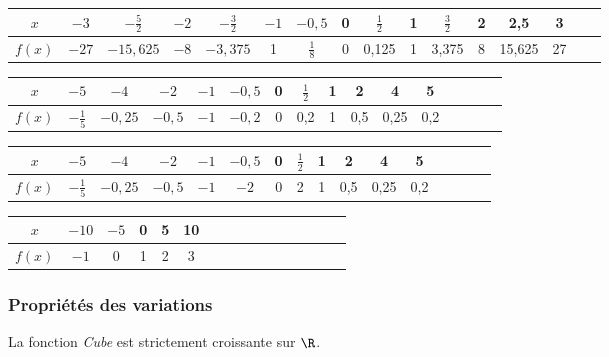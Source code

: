 \begin{tabular}{|c|c|c|c|c|c|c|c|c|c|c|c|c|c|c|c|}
\hline 
$x$ & $-3$ & $-\frac{5}{2}$ & $-2$ & $-\frac{3}{2}$ & $-1$ & $-0,5$ &  0 & $\frac{1}{2}$ & 1 & $\frac{3}{2}$ & 2 & 2,5 & 3 \\ 
\hline 
$f(x)$ & $-27$ & $-15,625$ & $-8$ & $-3,375$ & 1 & $\frac{1}{8}$ & 0 & 0,125 & 1 & 3,375 & 8 & 15,625  & 27 \\ 
\hline 
\end{tabular} 

\vspace{0.4cm}

\begin{tabular}{|c|c|c|c|c|c|c|c|c|c|c|c|c|c|c|c|}
\hline 
$x$ & $-5$ & $-4$ & $-2$ &   $-1$ & $-0,5$ &  0 & $\frac{1}{2}$ & 1 & 2 &   4 & 5 \\ 
\hline 
$f(x)$ & $-\frac{1}{5}$ & $-0,25$ &   $-0,5$ & $-1$ & $-0,2$ & 0 & 0,2  & 1 & 0,5 &  0,25  & 0,2 \\ 
\hline 
\end{tabular}

\vspace{0.4cm}

\begin{tabular}{|c|c|c|c|c|c|c|c|c|c|c|c|c|c|c|c|}
\hline 
$x$ & $-5$ & $-4$ & $-2$ &   $-1$ & $-0,5$ &  0 & $\frac{1}{2}$ & 1 & 2 &   4 & 5 \\ 
\hline 
$f(x)$ & $-\frac{1}{5}$ & $-0,25$ &   $-0,5$ & $-1$ & $-2$ & 0 & 2 & 1 & 0,5 &  0,25  & 0,2 \\ 
\hline 
\end{tabular}

\vspace{0.4cm} 

\begin{tabular}{|c|c|c|c|c|c|c|c|c|c|c|c|c|c|c|c|}
\hline 
$x$ & $-10$ &   $-5$ &  0 & 5 & 10 \\ 
\hline 
$f(x)$ & $-1$ &   $0$ &  1 & 2 & 3  \\ 
\hline 
\end{tabular}


\subsubsection*{Propriétés des variations} 

\begin{ThN}
La fonction \emph{Cube} est strictement croissante sur $\R$. 
\end{ThN}

\vspace{0.4cm} 

